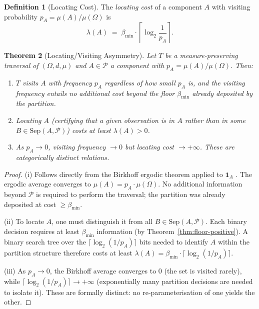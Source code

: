 \documentclass[12pt,a4paper,twocolumn]{article}
\theoremstyle{plain}
\newtheorem{theorem}{Theorem}[section]
\theoremstyle{definition}
\newtheorem{definition}[theorem]{Definition}
\theoremstyle{remark}
\newcommand{\Part}{\mathcal{P}}
\newcommand{\Sep}{\mathrm{Sep}}
\newcommand{\bmin}{\beta_{\min}}
\newcommand{\BRS}{(\Omega,d,\mu)}
\begin{document}
\begin{definition}[Locating Cost]
\label{def:locating-cost}
The \emph{locating cost} of a component $A$ with visiting probability
$p_A = \mu(A)/\mu(\Omega)$ is
\begin{equation}
  \lambda(A) \;=\; \bmin \cdot \left\lceil \log_2 \frac{1}{p_A} \right\rceil.
\end{equation}
\end{definition}

\begin{theorem}[Locating/Visiting Asymmetry]
\label{thm:locating-visiting}
Let $T$ be a measure-preserving traversal of $\BRS$ and $A \in \Part$ a
component with $p_A = \mu(A)/\mu(\Omega)$.  Then:
\begin{enumerate}[label=(\roman*)]
  \item $T$ visits $A$ with frequency $p_A$ regardless of how small $p_A$
    is, and the visiting frequency entails no additional cost beyond the
    floor $\bmin$ already deposited by the partition.
  \item Locating $A$ (certifying that a given observation is in $A$ rather
    than in some $B \in \Sep(A,\Part)$) costs at least $\lambda(A) > 0$.
  \item As $p_A \to 0$, visiting frequency $\to 0$ but locating cost
    $\to +\infty$.  These are categorically distinct relations.
\end{enumerate}
\end{theorem}

\begin{proof}
(i) Follows directly from the Birkhoff ergodic theorem applied to
$\mathbf{1}_A$ \citep{halmos1950measure}.  The ergodic average converges to
$\mu(A) = p_A \cdot \mu(\Omega)$.  No additional information beyond
$\Part$ is required to perform the traversal; the partition was already
deposited at cost $\geq \bmin$.

(ii) To locate $A$, one must distinguish it from all $B \in \Sep(A,\Part)$.
Each binary decision requires at least $\bmin$ information (by
Theorem~\ref{thm:floor-positive}).  A binary search tree over the
$\lceil\log_2(1/p_A)\rceil$ bits needed to identify $A$ within the
partition structure therefore costs at least $\lambda(A) = \bmin \cdot
\lceil\log_2(1/p_A)\rceil$.

(iii) As $p_A \to 0$, the Birkhoff average converges to $0$ (the set is
visited rarely), while $\lceil\log_2(1/p_A)\rceil \to +\infty$ (exponentially
many partition decisions are needed to isolate it).  These are formally
distinct: no re-parameterisation of one yields the other.
\end{proof}
\end{document}
